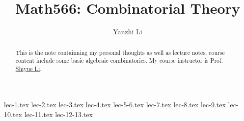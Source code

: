 \documentclass[a4paper]{report}
\author{Yanzhi Li}
\title{Math566: Combinatorial Theory}
\begin{document}
\maketitle

\begin{abstract}
	This is the note containning my personal thoughts as well as lecture notes, course content include some basic algebraic combinatorics. My course instructor is Prof. \href{https://www.shiyue.li}{Shiyue Li}.
\end{abstract}

\newpage

\tableofcontents

{lec-1.tex}
{lec-2.tex}
{lec-3.tex}
{lec-4.tex}
{lec-5-6.tex}
{lec-7.tex}
{lec-8.tex}
{lec-9.tex}
{lec-10.tex}
{lec-11.tex}
{lec-12-13.tex}

\newpage
\appendix
\appendixpage{}

%

\newpage
\pagestyle{plain}
\printbibliography{}
\end{document}
